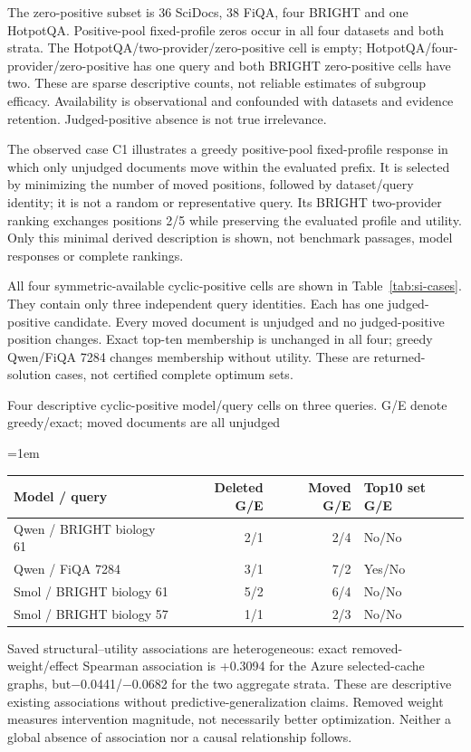 \documentclass[pdflatex,sn-basic,Numbered]{sn-jnl}
\renewcommand{\papertable}{\small\renewcommand{\arraystretch}{1.15}\setlength{\tabcolsep}{4pt}\emergencystretch=1em}
\begin{document}
The zero-positive subset is 36 SciDocs, 38 FiQA, four BRIGHT and one HotpotQA. Positive-pool fixed-profile zeros occur in all four datasets and both strata. The HotpotQA/two-provider/zero-positive cell is empty; HotpotQA/four-provider/zero-positive has one query and both BRIGHT zero-positive cells have two. These are sparse descriptive counts, not reliable estimates of subgroup efficacy. Availability is observational and confounded with datasets and evidence retention. Judged-positive absence is not true irrelevance.

The observed case C1 illustrates a greedy positive-pool fixed-profile response in which only unjudged documents move within the evaluated prefix. It is selected by minimizing the number of moved positions, followed by dataset/query identity; it is not a random or representative query. Its BRIGHT two-provider ranking exchanges positions 2/5 while preserving the evaluated profile and utility. Only this minimal derived description is shown, not benchmark passages, model responses or complete rankings.

All four symmetric-available cyclic-positive cells are shown in Table~\ref{tab:si-cases}. They contain only three independent query identities. Each has one judged-positive candidate. Every moved document is unjudged and no judged-positive position changes. Exact top-ten membership is unchanged in all four; greedy Qwen/FiQA 7284 changes membership without utility. These are returned-solution cases, not certified complete optimum sets.
\begin{supplementtable}\caption{Four descriptive cyclic-positive model/query cells on three queries. G/E denote greedy/exact; moved documents are all unjudged}\label{tab:si-cases}\papertable
\begin{tabularx}{\linewidth}{@{}Yrrl@{}}\toprule
Model / query&Deleted G/E&Moved G/E&Top10 set G/E\\\midrule
Qwen / BRIGHT biology 61&2/1&2/4&No/No\\
Qwen / FiQA 7284&3/1&7/2&Yes/No\\
Smol / BRIGHT biology 61&5/2&6/4&No/No\\
Smol / BRIGHT biology 57&1/1&2/3&No/No\\\bottomrule
\end{tabularx}\end{supplementtable}

Saved structural--utility associations are heterogeneous: exact removed-weight/effect Spearman association is +0.3094 for the Azure selected-cache graphs, but−0.0441/−0.0682 for the two aggregate strata. These are descriptive existing associations without predictive-generalization claims. Removed weight measures intervention magnitude, not necessarily better optimization. Neither a global absence of association nor a causal relationship follows.
\end{document}
